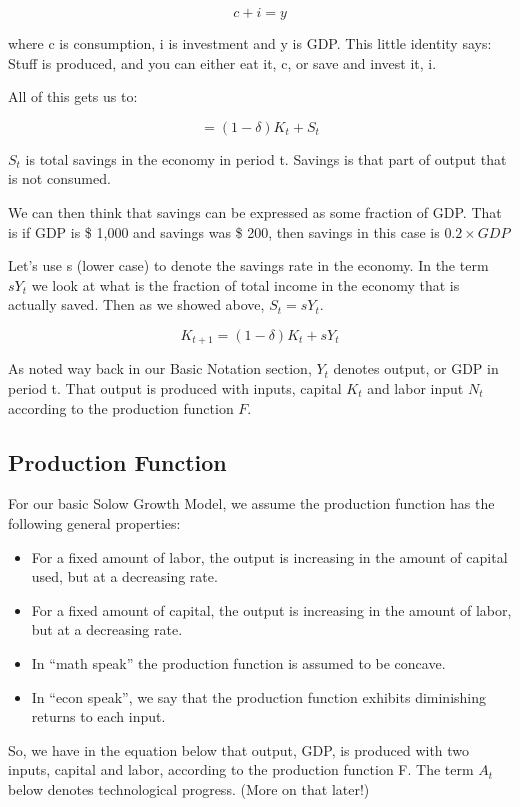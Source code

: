 \documentclass[
]{book}
\providecommand{\tightlist}{%
  \setlength{\itemsep}{0pt}\setlength{\parskip}{0pt}}
\begin{document}
\[c + i = y\]

where c is consumption, i is investment and y is GDP. This little identity says: Stuff is produced, and you can either eat it, c, or save and invest it, i.

All of this gets us to:

\[=(1-\delta)K_t+S_t\]

\(S_t\) is total savings in the economy in period t. Savings is that part of output that is not consumed.

We can then think that savings can be expressed as some fraction of GDP. That is if GDP is \$ 1,000 and savings was \$ 200, then savings in this case is \(0.2 \times GDP\)

Let's use s (lower case) to denote the savings rate in the economy. In the term \(sY_t\) we look at what is the fraction of total income in the economy that is actually saved. Then as we showed above, \(S_t=sY_t\).

\[K_{t+1}=(1-\delta) K_t+sY_t\]

As noted way back in our Basic Notation section, \(Y_t\) denotes output, or GDP in period t. That output is produced with inputs, capital \(K_t\) and labor input \(N_t\) according to the production function \(F\).

\hypertarget{production-function}{%
\subsection{Production Function}\label{production-function}}

For our basic Solow Growth Model, we assume the production function has the following general properties:

\begin{itemize}
\tightlist
\item
  For a fixed amount of labor, the output is increasing in the amount of capital used, but at a decreasing rate.
\item
  For a fixed amount of capital, the output is increasing in the amount of labor, but at a decreasing rate.
\item
  In ``math speak'' the production function is assumed to be concave.
\item
  In ``econ speak'', we say that the production function exhibits diminishing returns to each input.
\end{itemize}

So, we have in the equation below that output, GDP, is produced with two inputs, capital and labor, according to the production function F. The term \(A_t\) below denotes technological progress. (More on that later!)
\end{document}
